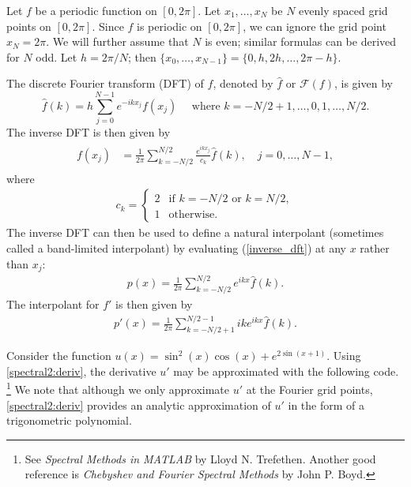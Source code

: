 \label{lab:pseudospectral2}


Let $f$ be a periodic function on $[0,2\pi]$.
Let $x_1,\ldots,x_N$ be $N$ evenly spaced grid points on $[0,2\pi]$.
Since $f$ is periodic on $[0,2\pi]$, we can ignore the grid point $x_N = 2\pi$.
We will further assume that $N$ is even; similar formulas can be derived for $N$ odd.
Let $h = 2\pi/N$; then $\{x_0,\ldots,x_{N-1}\} = \{0,h,2h,\ldots,2\pi-h\}$.

The discrete Fourier transform (DFT) of $f$, denoted by $\hat{f}$ or $\mathcal{F}(f)$, is given by
\[
\hat{f}(k) = h \sum_{j=0}^{N-1} e^{-ikx_j}f(x_j) \quad \text{ where } k = -N/2+1, \ldots,0,1,\ldots, N/2.
\]
The inverse DFT is then given by
\begin{align}
\begin{split}
f(x_j) &= \frac{1}{2\pi}\sum_{k=-N/2}^{N/2}\frac{e^{ikx_j}}{c_k}\hat{f}(k), \quad j = 0,\ldots, N-1,
\end{split}\label{inverse_dft}
\end{align}
where
\begin{align}
	c_k = \begin{cases} 2 & \text{if }k = -N/2 \text{ or }k = N/2, \\ 1 &  \text{otherwise.}
\end{cases}
\end{align}
The inverse DFT can then be used to define a natural interpolant (sometimes called a band-limited interpolant) by evaluating (\ref{inverse_dft}) at any $x$ rather than $x_j$:
\begin{align}
p(x) = \frac{1}{2\pi}\sum_{k=-N/2}^{N/2} e^{ikx}\hat{f}(k). \label{interpolant}
\end{align}
The interpolant for $f'$ is then given by
\begin{align}
p'(x) = \frac{1}{2\pi}\sum_{k=-N/2+1}^{N/2-1} ike^{ikx}\hat{f}(k). \label{spectral2:deriv}
\end{align}

Consider the function $u(x) = \sin^2 (x) \cos(x) +e^{2\sin(x+1)}$.
Using \eqref{spectral2:deriv}, the derivative $u'$ may be approximated with the following code.
\footnote{See \textit{Spectral Methods in MATLAB} by Lloyd N. Trefethen.
Another good reference is \textit{Chebyshev and Fourier Spectral Methods} by John P. Boyd.}
We note that although we only approximate $u'$ at the Fourier grid points, \eqref{spectral2:deriv} provides an analytic approximation of $u'$ in the form of a trigonometric polynomial.


